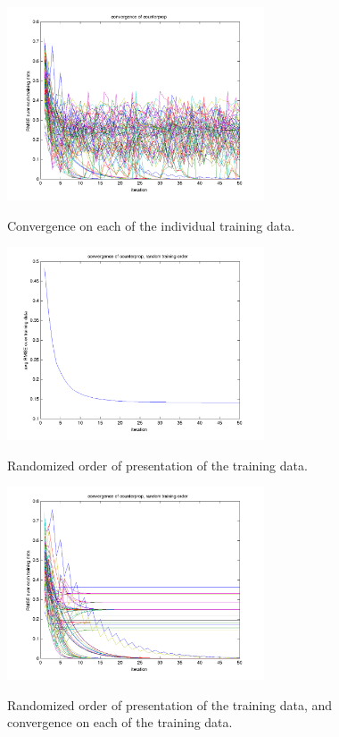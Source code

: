 \documentclass[pre,twocolumn,twoside,byrevtex,superscriptaddress]{revtex4}
\begin{document}
    \begin{figure}
      \centering
      \includegraphics[width=0.68\textwidth]{112.png}
      \label{fig:2}
      \caption{Convergence on each of the individual training data.}
    \end{figure}

    \begin{figure}
      \centering
      \includegraphics[width=0.68\textwidth]{113.png}
      \label{fig:3}
      \caption{Randomized order of presentation of the training data.}
    \end{figure}

    \begin{figure}
      \centering
      \includegraphics[width=0.68\textwidth]{114.png}
      \label{fig:4}
      \caption{Randomized order of presentation of the training data, and convergence on each of the training data.}
    \end{figure}
\end{document}
